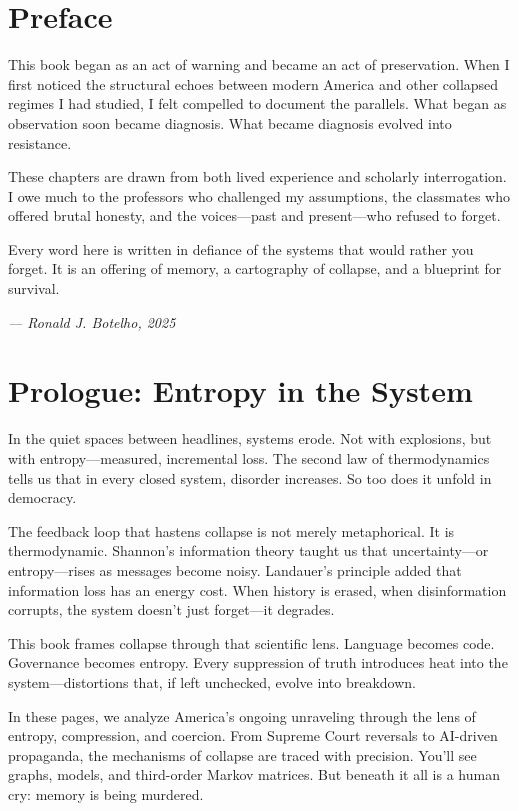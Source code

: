 \newpage

\section*{Preface}
This book began as an act of warning and became an act of preservation. When I first noticed the structural echoes between modern America and other collapsed regimes I had studied, I felt compelled to document the parallels. What began as observation soon became diagnosis. What became diagnosis evolved into resistance.

These chapters are drawn from both lived experience and scholarly interrogation. I owe much to the professors who challenged my assumptions, the classmates who offered brutal honesty, and the voices—past and present—who refused to forget.

Every word here is written in defiance of the systems that would rather you forget. It is an offering of memory, a cartography of collapse, and a blueprint for survival.

\begin{flushright}
\textit{--- Ronald J. Botelho, 2025}
\end{flushright}

\newpage

\section*{Prologue: Entropy in the System}
In the quiet spaces between headlines, systems erode. Not with explosions, but with entropy—measured, incremental loss. The second law of thermodynamics tells us that in every closed system, disorder increases. So too does it unfold in democracy.

The feedback loop that hastens collapse is not merely metaphorical. It is thermodynamic. Shannon’s information theory taught us that uncertainty—or entropy—rises as messages become noisy. Landauer’s principle added that information loss has an energy cost. When history is erased, when disinformation corrupts, the system doesn’t just forget—it degrades.

This book frames collapse through that scientific lens. Language becomes code. Governance becomes entropy. Every suppression of truth introduces heat into the system—distortions that, if left unchecked, evolve into breakdown.

In these pages, we analyze America’s ongoing unraveling through the lens of entropy, compression, and coercion. From Supreme Court reversals to AI-driven propaganda, the mechanisms of collapse are traced with precision. You’ll see graphs, models, and third-order Markov matrices. But beneath it all is a human cry: memory is being murdered.

